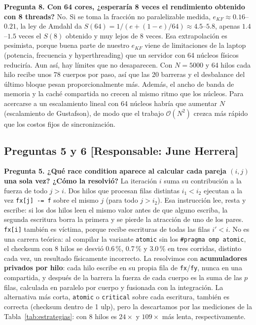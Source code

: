 \documentclass[11pt,a4paper]{article}
\begin{document}
\textbf{Pregunta 8. Con 64 cores, ¿esperaría 8 veces el rendimiento obtenido con 8 threads?}
No. Si se toma la fracción no paralelizable medida, $e_{KF} \approx 0.16$--$0.21$, la ley de Amdahl da $S(64) = 1/(e + (1-e)/64) \approx 4.5$--$5.8$, apenas $1.4$--$1.5$ veces el $S(8)$ obtenido y muy lejos de 8 veces. Esa extrapolación es pesimista, porque buena parte de nuestro $e_{KF}$ viene de limitaciones de la laptop (potencia, frecuencia y hyperthreading) que un servidor con 64 núcleos físicos reduciría. Aun así, hay límites que no desaparecen. Con $N = 5000$ y 64 hilos cada hilo recibe unos 78 cuerpos por paso, así que las 20 barreras y el desbalance del último bloque pesan proporcionalmente más. Además, el ancho de banda de memoria y la caché compartida no crecen al mismo ritmo que los núcleos. Para acercarse a un escalamiento lineal con 64 núcleos habría que aumentar $N$ (escalamiento de Gustafson), de modo que el trabajo $\mathcal{O}(N^2)$ crezca más rápido que los costos fijos de sincronización.

\subsection*{Preguntas 5 y 6 [Responsable: June Herrera]}
\textbf{Pregunta 5. ¿Qué race condition aparece al calcular cada pareja $(i,j)$ una sola vez? ¿Cómo la resolvió?}
La iteración $i$ suma su contribución a la fuerza de todo $j > i$. Dos hilos que procesan filas distintas $i_1 < i_2$ ejecutan a la vez \texttt{fx[j] -= f} sobre el mismo $j$ (para todo $j > i_2$). Esa instrucción lee, resta y escribe: si los dos hilos leen el mismo valor antes de que alguno escriba, la segunda escritura borra la primera y se pierde la atracción de uno de los pares. \texttt{fx[i]} también es víctima, porque recibe escrituras de todas las filas $i' < i$. No es una carrera teórica: al compilar la variante \texttt{atomic} sin los \texttt{\#pragma omp atomic}, el checksum con 8 hilos se desvió 0.6\,\%, 0.7\,\% y 3.0\,\% en tres corridas, distinto cada vez, un resultado físicamente incorrecto. La resolvimos con \textbf{acumuladores privados por hilo}: cada hilo escribe en su propia fila de \texttt{fx}/\texttt{fy}, nunca en una compartida, y después de la barrera la fuerza de cada cuerpo es la suma de las $p$ filas, calculada en paralelo por cuerpo y fusionada con la integración. La alternativa más corta, \texttt{atomic} o \texttt{critical} sobre cada escritura, también es correcta (checksum dentro de 1 ulp), pero la descartamos por las mediciones de la Tabla~\ref{tab:estrategias}: con 8 hilos es $24\times$ y $109\times$ más lenta, respectivamente.
\end{document}
